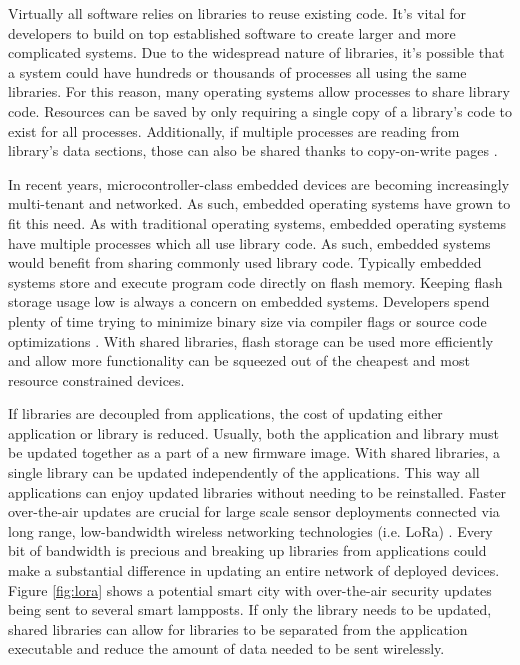 \documentclass[12pt]{ucsddissertation}
\begin{document}
\mainmatter

\begin{dissertationintroduction}
Virtually all software relies on libraries to reuse existing code. It's vital for developers to build on top established software to create larger and more complicated systems. Due to the widespread nature of libraries, it's possible that a system could have hundreds or thousands of processes all using the same libraries. For this reason, many operating systems allow processes to share library code. Resources can be saved by only requiring a single copy of a library's code to exist for all processes. Additionally, if multiple processes are reading from library's data sections, those can also be shared thanks to copy-on-write pages \cite{cow}.

In recent years, microcontroller-class embedded devices are becoming increasingly multi-tenant and networked. As such, embedded operating systems have grown to fit this need. As with traditional operating systems, embedded operating systems have multiple processes which all use library code. As such, embedded systems would benefit from sharing commonly used library code. Typically embedded systems store and execute program code directly on flash memory. Keeping flash storage usage low is always a concern on embedded systems. Developers spend plenty of time trying to minimize binary size via compiler flags or source code optimizations \cite{llvm, hudson}. With shared libraries, flash storage can be used more efficiently and allow more functionality can be squeezed out of the cheapest and most resource constrained devices.

    If libraries are decoupled from applications, the cost of updating either application or library is reduced. Usually, both the application and library must be updated together as a part of a new firmware image. With shared libraries, a single library can be updated independently of the applications. This way all applications can enjoy updated libraries without needing to be reinstalled. Faster over-the-air updates are crucial for large scale sensor deployments connected via long range, low-bandwidth wireless networking technologies (i.e. LoRa) \cite{lora1, lora2}. Every bit of bandwidth is precious and breaking up libraries from applications could make a substantial difference in updating an entire network of deployed devices. Figure \ref{fig:lora} shows a potential smart city with over-the-air security updates being sent to several smart lampposts. If only the library needs to be updated, shared libraries can allow for libraries to be separated from the application executable and reduce the amount of data needed to be sent wirelessly. 


\end{dissertationintroduction}
\end{document}

